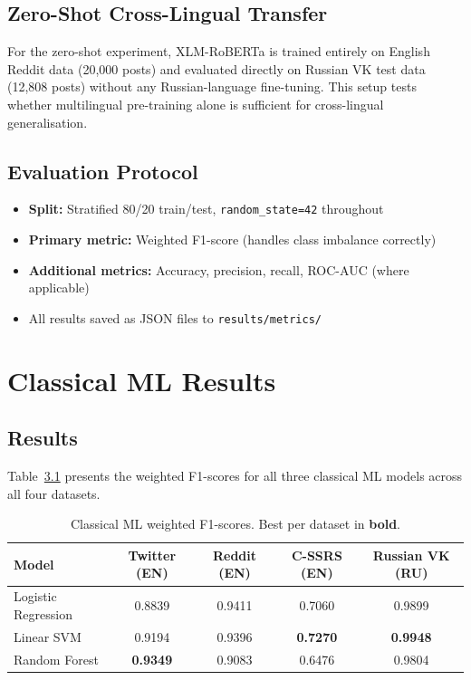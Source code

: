 \documentclass[12pt, a4paper, oneside]{report}
\begin{document}
\section{Zero-Shot Cross-Lingual Transfer}

For the zero-shot experiment, XLM-RoBERTa is trained entirely on English Reddit data (20,000 posts) and evaluated directly on Russian VK test data (12,808 posts) without any Russian-language fine-tuning. This setup tests whether multilingual pre-training alone is sufficient for cross-lingual generalisation.

\section{Evaluation Protocol}

\begin{itemize}
    \item \textbf{Split:} Stratified 80/20 train/test, \texttt{random\_state=42} throughout
    \item \textbf{Primary metric:} Weighted F1-score (handles class imbalance correctly)
    \item \textbf{Additional metrics:} Accuracy, precision, recall, ROC-AUC (where applicable)
    \item All results saved as JSON files to \texttt{results/metrics/}
\end{itemize}

\chapter{Classical ML Results}
\label{ch:ml}

\section{Results}

Table~\ref{tab:ml_results} presents the weighted F1-scores for all three classical ML models across all four datasets.

\begin{table}[H]
\centering
\caption{Classical ML weighted F1-scores. Best per dataset in \textbf{bold}.}
\label{tab:ml_results}
\begin{tabular}{lcccc}
\toprule
\textbf{Model} & \textbf{Twitter (EN)} & \textbf{Reddit (EN)} & \textbf{C-SSRS (EN)} & \textbf{Russian VK (RU)} \\
\midrule
Logistic Regression & 0.8839 & 0.9411 & 0.7060 & 0.9899 \\
Linear SVM          & 0.9194 & 0.9396 & \textbf{0.7270} & \textbf{0.9948} \\
Random Forest       & \textbf{0.9349} & 0.9083 & 0.6476 & 0.9804 \\
\bottomrule
\end{tabular}
\end{table}
\end{document}

